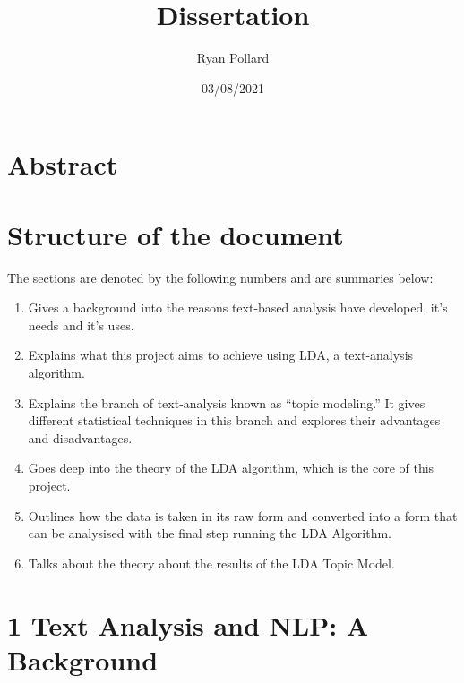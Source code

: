 \documentclass[
]{article}
\title{Dissertation}
\author{Ryan Pollard}
\date{03/08/2021}
\providecommand{\tightlist}{%
  \setlength{\itemsep}{0pt}\setlength{\parskip}{0pt}}
\begin{document}
\maketitle

\tableofcontents
\pagebreak

\hypertarget{abstract}{%
\section{Abstract}\label{abstract}}

\hypertarget{structure-of-the-document}{%
\section{Structure of the document}\label{structure-of-the-document}}

The sections are denoted by the following numbers and are summaries
below:

\begin{enumerate}
\def\labelenumi{\arabic{enumi}.}
\tightlist
\item
  Gives a background into the reasons text-based analysis have
  developed, it's needs and it's uses.
\item
  Explains what this project aims to achieve using LDA, a text-analysis
  algorithm.
\item
  Explains the branch of text-analysis known as ``topic modeling.'' It
  gives different statistical techniques in this branch and explores
  their advantages and disadvantages.
\item
  Goes deep into the theory of the LDA algorithm, which is the core of
  this project.
\item
  Outlines how the data is taken in its raw form and converted into a
  form that can be analysised with the final step running the LDA
  Algorithm.
\item
  Talks about the theory about the results of the LDA Topic Model.
\end{enumerate}

\hypertarget{text-analysis-and-nlp-a-background}{%
\section{1 Text Analysis and NLP: A
Background}\label{text-analysis-and-nlp-a-background}}
\end{document}
